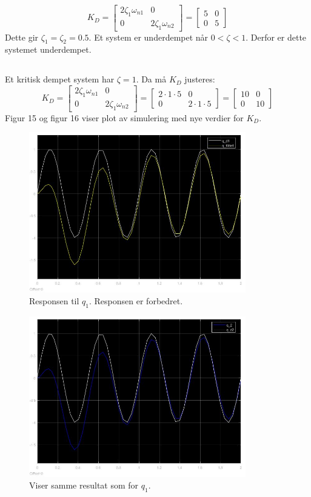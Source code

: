 \documentclass[norsk]{article}
\begin{document}
\[K_D = \begin{bmatrix}
2\zeta_1\omega_{n1} & 0 \\ 0 & 2\zeta_1\omega_{n2}
\end{bmatrix} 
= 
\begin{bmatrix}
5 & 0 \\ 0 & 5 
\end{bmatrix}
\]
Dette gir \(\zeta_1 = \zeta_2 = 0.5\). Et system er underdempet når \(0 < \zeta < 1\). Derfor er dette systemet underdempet. 
\subsection{ }
Et kritisk dempet system har \(\zeta = 1\). Da må \(K_D\) justeres:
\[K_D = \begin{bmatrix}
2\zeta_1\omega_{n1} & 0 \\ 0 & 2\zeta_1\omega_{n2}
\end{bmatrix} 
= 
\begin{bmatrix}
2 \cdot 1 \cdot 5 & 0 \\ 0 & 2 \cdot 1 \cdot 5 
\end{bmatrix}
= 
\begin{bmatrix}
10 & 0 \\ 0 & 10 
\end{bmatrix}
\]
Figur 15 og figur 16 viser plot av simulering med nye verdier for \(K_D\).

\begin{figure}[H]
\includegraphics[height=7cm]{illustrations/oppg3g_illu1}
\caption{Responsen til \(q_1\). Responsen er forbedret.}
\end{figure}

\begin{figure}[H]
\includegraphics[height=7cm]{illustrations/oppg3g_illu2}
\caption{Viser samme resultat som for \(q_1\).}
\end{figure}

\subsection{ }
\end{document}
